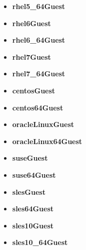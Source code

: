 \begin{itemize}
\item \textbf{rhel5\_64Guest} 
\end{itemize}
\begin{itemize}
\item \textbf{rhel6Guest} 
\end{itemize}
\begin{itemize}
\item \textbf{rhel6\_64Guest} 
\end{itemize}
\begin{itemize}
\item \textbf{rhel7Guest} 
\end{itemize}
\begin{itemize}
\item \textbf{rhel7\_64Guest} 
\end{itemize}
\begin{itemize}
\item \textbf{centosGuest} 
\end{itemize}
\begin{itemize}
\item \textbf{centos64Guest} 
\end{itemize}
\begin{itemize}
\item \textbf{oracleLinuxGuest} 
\end{itemize}
\begin{itemize}
\item \textbf{oracleLinux64Guest} 
\end{itemize}
\begin{itemize}
\item \textbf{suseGuest} 
\end{itemize}
\begin{itemize}
\item \textbf{suse64Guest} 
\end{itemize}
\begin{itemize}
\item \textbf{slesGuest} 
\end{itemize}
\begin{itemize}
\item \textbf{sles64Guest} 
\end{itemize}
\begin{itemize}
\item \textbf{sles10Guest} 
\end{itemize}
\begin{itemize}
\item \textbf{sles10\_64Guest} 
\end{itemize}
